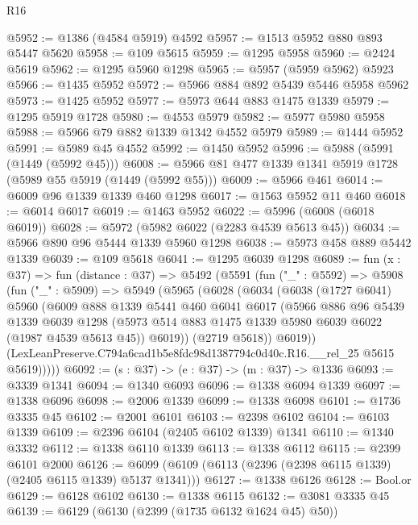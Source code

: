 \begin{lexlean}{R16}
\begin{coremodule}
@5952 := @1386 (@4584 @5919) @4592
@5957 := @1513 @5952 @880 @893 @5447 @5620
@5958 := @109 @5615
@5959 := @1295 @5958
@5960 := @2424 @5619
@5962 := @1295 @5960 @1298
@5965 := @5957 (@5959 @5962) @5923
@5966 := @1435 @5952
@5972 := @5966 @884 @892 @5439 @5446 @5958 @5962
@5973 := @1425 @5952
@5977 := @5973 @644 @883 @1475 @1339
@5979 := @1295 @5919 @1728
@5980 := @4553 @5979
@5982 := @5977 @5980 @5958
@5988 := @5966 @79 @882 @1339 @1342 @4552 @5979
@5989 := @1444 @5952
@5991 := @5989 @45 @4552
@5992 := @1450 @5952
@5996 := @5988 (@5991 (@1449 (@5992 @45)))
@6008 := @5966 @81 @477 @1339 @1341 @5919 @1728 (@5989 @55 @5919 (@1449 (@5992 @55)))
@6009 := @5966 @461
@6014 := @6009 @96 @1339 @1339 @460 @1298
@6017 := @1563 @5952 @11 @460
@6018 := @6014 @6017
@6019 := @1463 @5952
@6022 := @5996 (@6008 (@6018 @6019))
@6028 := @5972 (@5982 @6022 (@2283 @4539 @5613 @45))
@6034 := @5966 @890 @96 @5444 @1339 @5960 @1298
@6038 := @5973 @458 @889 @5442 @1339
@6039 := @109 @5618
@6041 := @1295 @6039 @1298
@6089 := fun (x : @37) =>
  fun (distance : @37) =>
  @5492
    (@5591
      (fun ("_" : @5592) =>
      @5908
        (fun ("_" : @5909) =>
        @5949
          (@5965
            (@6028
              (@6034
                (@6038
                  (@1727 @6041)
                  @5960
                  (@6009
                    @888
                    @1339
                    @5441
                    @460
                    @6041
                    @6017
                    (@5966
                      @886
                      @96
                      @5439
                      @1339
                      @6039
                      @1298
                      (@5973 @514 @883 @1475 @1339 @5980 @6039 @6022 (@1987 @4539 @5613 @45))
                      @6019))
                  (@2719 @5618))
                @6019))
            (LexLeanPreserve.C794a6cad1b5e8fdc98d1387794c0d40c.R16.__rel_25 @5615 @5619)))))
@6092 := (s : @37) -> (e : @37) -> (m : @37) -> @1336
@6093 := @3339 @1341
@6094 := @1340 @6093
@6096 := @1338 @6094 @1339
@6097 := @1338 @6096
@6098 := @2006 @1339
@6099 := @1338 @6098
@6101 := @1736 @3335 @45
@6102 := @2001 @6101
@6103 := @2398 @6102
@6104 := @6103 @1339
@6109 := @2396 @6104 (@2405 @6102 @1339) @1341
@6110 := @1340 @3332
@6112 := @1338 @6110 @1339
@6113 := @1338 @6112
@6115 := @2399 @6101 @2000
@6126 := @6099 (@6109 (@6113 (@2396 (@2398 @6115 @1339) (@2405 @6115 @1339) @5137 @1341)))
@6127 := @1338 @6126
@6128 := Bool.or
@6129 := @6128 @6102
@6130 := @1338 @6115
@6132 := @3081 @3335 @45
@6139 := @6129 (@6130 (@2399 (@1735 @6132 @1624 @45) @50))

\end{coremodule}
\end{lexlean}
